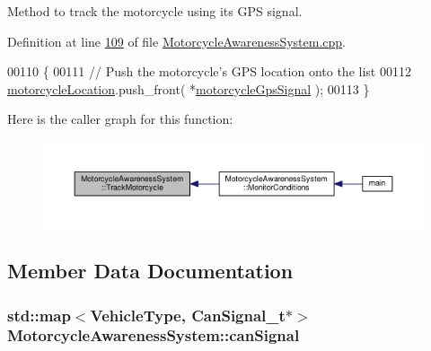Method to track the motorcycle using its G\-P\-S signal. 



Definition at line \hyperlink{MotorcycleAwarenessSystem_8cpp_source_l00109}{109} of file \hyperlink{MotorcycleAwarenessSystem_8cpp_source}{Motorcycle\-Awareness\-System.\-cpp}.


\begin{DoxyCode}
00110 \{
00111     \textcolor{comment}{// Push the motorcycle's GPS location onto the list}
00112     \hyperlink{classMotorcycleAwarenessSystem_af6becfeb1d11b467cb80a94a8e6940ac}{motorcycleLocation}.push\_front( *\hyperlink{classMotorcycleAwarenessSystem_ab281a3993b574923b2f379ed0477b2d4}{motorcycleGpsSignal} );
00113 \}
\end{DoxyCode}


Here is the caller graph for this function\-:\nopagebreak
\begin{figure}[H]
\begin{center}
\leavevmode
\includegraphics[width=350pt]{classMotorcycleAwarenessSystem_a4e6eec23ec46e24ee377a3c94e15eba4_icgraph}
\end{center}
\end{figure}




\subsection{Member Data Documentation}
\hypertarget{classMotorcycleAwarenessSystem_a2d8ac602ae24dcf38aaa95a42ffb4e1f}{
\subsubsection[{can\-Signal}]{\setlength{\rightskip}{0pt plus 5cm}std\-::map$<${\bf Vehicle\-Type}, {\bf Can\-Signal\-\_\-t}$\ast$$>$ Motorcycle\-Awareness\-System\-::can\-Signal\hspace{0.3cm}{\ttfamily [private]}}}\label{classMotorcycleAwarenessSystem_a2d8ac602ae24dcf38aaa95a42ffb4e1f}


